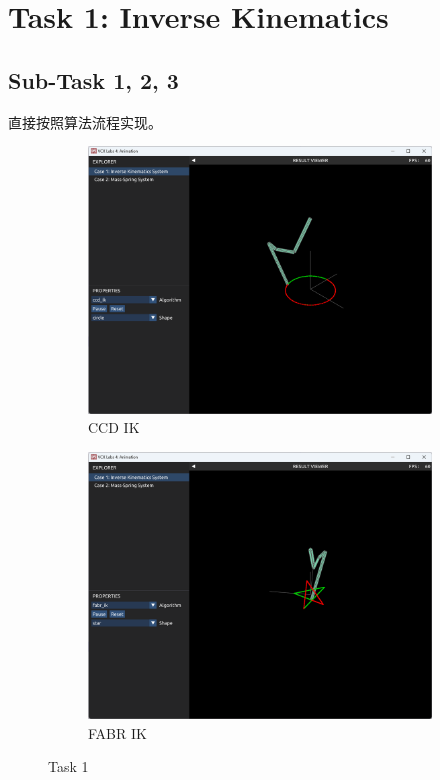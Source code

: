 \documentclass[UTF8]{ctexart}
\begin{document}
\section*{Task 1: Inverse Kinematics}

\subsection*{Sub-Task 1, 2, 3}

直接按照算法流程实现。

\begin{figure}[htbp]
    \hfill
    \begin{subfigure}[b]{0.49\textwidth}
        \centering
        \includegraphics[width=\textwidth]{images/1-1.png}
        \caption{CCD IK}
    \end{subfigure}
    \hfill
    \begin{subfigure}[b]{0.49\textwidth}
        \centering
        \includegraphics[width=\textwidth]{images/1-2.png}
        \caption{FABR IK}
    \end{subfigure}
    \hfill
    \caption*{Task 1}
\end{figure}
\end{document}
